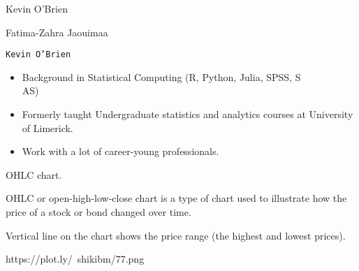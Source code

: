 
Kevin O'Brien

Fatima-Zahra Jaouimaa

\begin{frame}
\large
\texttt{Kevin O'Brien}
\begin{itemize}
\item Background in Statistical Computing (R, Python, Julia, SPSS, S\\AS)
\medskip
\item Formerly taught Undergraduate statistics and analytics courses at University of Limerick.
\medskip
\item Work with a lot of career-young professionals.

\end{itemize}
\end{frame}

OHLC chart. 

OHLC or open-high-low-close chart is a type of chart used to illustrate how the price of a stock or bond changed over time. 

Vertical line on the chart shows the price range (the highest and lowest prices).


https://plot.ly/~shikibm/77.png


